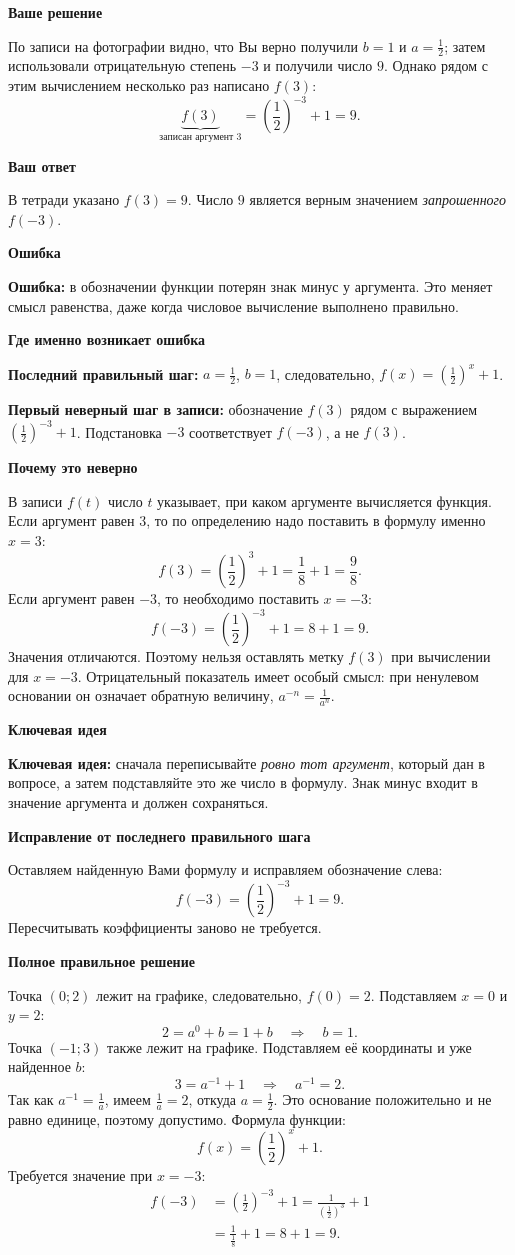 \documentclass[a4paper,11pt]{article}
\newcommand{\para}[1]{\par\needspace{3\baselineskip}\textbf{#1}\par\nobreak}
\begin{document}
\para{Ваше решение}
По записи на фотографии видно, что Вы верно получили $b=1$ и $a=\tfrac12$; затем использовали отрицательную степень $-3$ и получили число $9$. Однако рядом с этим вычислением несколько раз написано $f(3)$:
\[
  \underbrace{f(3)}_{\text{записан аргумент }3}
  =\left(\frac12\right)^{-3}+1=9.
\]

\para{Ваш ответ}
В тетради указано $f(3)=9$. Число $9$ является верным значением \emph{запрошенного} $f(-3)$.

\para{Ошибка}
\textcolor{redmark}{\textbf{Ошибка:}} в обозначении функции потерян знак минус у аргумента. Это меняет смысл равенства, даже когда числовое вычисление выполнено правильно.

\para{Где именно возникает ошибка}
\textbf{Последний правильный шаг:} $a=\tfrac12$, $b=1$, следовательно, $f(x)=\left(\tfrac12\right)^x+1$.

\textbf{Первый неверный шаг в записи:} обозначение $f(3)$ рядом с выражением $\left(\tfrac12\right)^{-3}+1$. Подстановка $-3$ соответствует $f(-3)$, а не $f(3)$.

\para{Почему это неверно}
В записи $f(t)$ число $t$ указывает, при каком аргументе вычисляется функция. Если аргумент равен $3$, то по определению надо поставить в формулу именно $x=3$:
\[
  f(3)=\left(\frac12\right)^3+1=\frac18+1=\frac98.
\]
Если аргумент равен $-3$, то необходимо поставить $x=-3$:
\[
  f(-3)=\left(\frac12\right)^{-3}+1=8+1=9.
\]
Значения отличаются. Поэтому нельзя оставлять метку $f(3)$ при вычислении для $x=-3$. Отрицательный показатель имеет особый смысл: при ненулевом основании он означает обратную величину, $a^{-n}=\frac1{a^n}$.

\para{Ключевая идея}
\textcolor{darkaccent}{\textbf{Ключевая идея:}} сначала переписывайте \emph{ровно тот аргумент}, который дан в вопросе, а затем подставляйте это же число в формулу. Знак минус входит в значение аргумента и должен сохраняться.

\para{Исправление от последнего правильного шага}
Оставляем найденную Вами формулу и исправляем обозначение слева:
\[
  \boxed{f(-3)=\left(\frac12\right)^{-3}+1=9.}
\]
Пересчитывать коэффициенты заново не требуется.

\para{Полное правильное решение}
Точка $(0;2)$ лежит на графике, следовательно, $f(0)=2$. Подставляем $x=0$ и $y=2$:
\[
  2=a^0+b=1+b\quad\Longrightarrow\quad b=1.
\]
Точка $(-1;3)$ также лежит на графике. Подставляем её координаты и уже найденное $b$:
\[
  3=a^{-1}+1\quad\Longrightarrow\quad a^{-1}=2.
\]
Так как $a^{-1}=\frac1a$, имеем $\frac1a=2$, откуда $a=\frac12$. Это основание положительно и не равно единице, поэтому допустимо. Формула функции:
\[
  f(x)=\left(\frac12\right)^x+1.
\]
Требуется значение при $x=-3$:
\[
\begin{aligned}
  f(-3)&=\left(\frac12\right)^{-3}+1
  =\frac{1}{(\frac12)^3}+1\\
  &=\frac1{\frac18}+1=8+1=9.
\end{aligned}
\]
\end{document}
